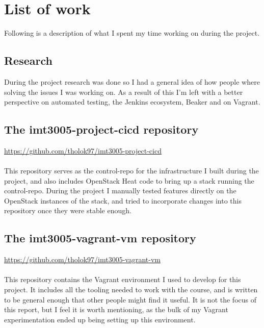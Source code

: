 
\section{List of work} \label{listofwork}

Following is a description of what I spent my time working on during the project.

\subsection{Research}

During the project research was done so I had a general idea of how people where solving the issues I was working on. As a result of this I'm left with a better perspective on automated testing, the Jenkins ecosystem, Beaker and on Vagrant.

\subsection{The imt3005-project-cicd repository}

\url{https://github.com/tholok97/imt3005-project-cicd}
\\
\\
This repository serves as the control-repo for the infrastructure I built during the project, and also includes OpenStack Heat code to bring up a stack running the control-repo. During the project I manually tested features directly on the OpenStack instances of the stack, and tried to incorporate changes into this repository once they were stable enough.

\subsection{The imt3005-vagrant-vm repository}

\url{https://github.com/tholok97/imt3005-vagrant-vm}
\\
\\
This repository contains the Vagrant environment I used to develop for this project. It includes all the tooling needed to work with the course, and is written to be general enough that other people might find it useful. It is not the focus of this report, but I feel it is worth mentioning, as the bulk of my Vagrant experimentation ended up being setting up this environment.

